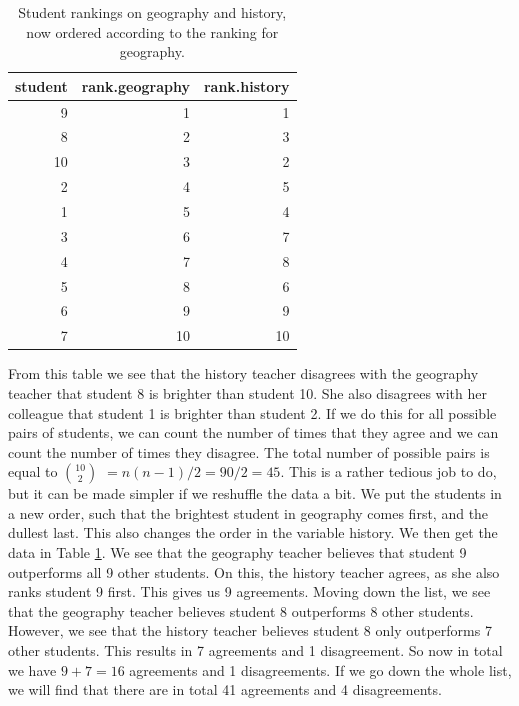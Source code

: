 \documentclass[]{book}\usepackage[]{graphicx}\usepackage[]{color}
\begin{document}
\begin{table}[ht]
\centering
\caption{Student rankings on geography and history, now ordered according to the ranking for geography.} 
\label{tab:nonpar_7}
\begin{tabular}{rrr}
  \hline
student & rank.geography & rank.history \\ 
  \hline
9 & 1 & 1 \\ 
  8 & 2 & 3 \\ 
  10 & 3 & 2 \\ 
  2 & 4 & 5 \\ 
  1 & 5 & 4 \\ 
  3 & 6 & 7 \\ 
  4 & 7 & 8 \\ 
  5 & 8 & 6 \\ 
  6 & 9 & 9 \\ 
  7 & 10 & 10 \\ 
   \hline
\end{tabular}
\end{table}


From this table we see that the history teacher disagrees with the geography teacher that student 8 is brighter than student 10. She also disagrees with her colleague that student 1 is brighter than student 2. If we do this for all possible pairs of students, we can count the number of times that they agree and we can count the number of times they disagree. The total number of possible pairs is equal to $10 \choose 2$ $= n(n-1)/2 = 90/2= 45$. This is a rather tedious job to do, but it can be made simpler if we reshuffle the data a bit. We put the students in a new order, such that the brightest student in geography comes first, and the dullest last. This also changes the order in the variable history. We then get the data in Table \ref{tab:nonpar_7}. We see that the geography teacher believes that student 9 outperforms all 9 other students. On this, the history teacher agrees, as she also ranks student 9 first. This gives us 9 agreements. Moving down the list, we see that the geography teacher believes student 8 outperforms 8 other students. However, we see that the history teacher believes student 8 only outperforms 7 other students. This results in 7 agreements and 1 disagreement. So now in total we have $9+7=16$ agreements and 1 disagreements. If we go down the whole list, we will find that there are in total 41 agreements and 4 disagreements. 
\end{document}
